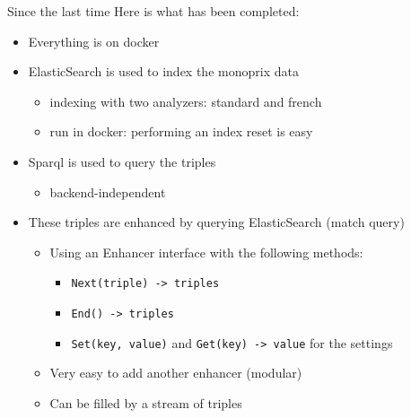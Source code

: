 \documentclass[10pt]{beamer}
\begin{document}
\begin{frame}{Since the last time}
    Here is what has been completed:
	\begin{itemize}
		\item Everything is on docker
	    \item ElasticSearch is used to index the monoprix data
	    \begin{itemize}
	        \item indexing with two analyzers: standard and french
	        \item run in docker: performing an index reset is easy
	    \end{itemize}
	    \item Sparql is used to query the triples
	    \begin{itemize}
	        \item backend-independent
	    \end{itemize}
	    \item These triples are enhanced by querying ElasticSearch (match query)
	    \begin{itemize}
	        \item Using an Enhancer interface with the following methods:
	        \begin{itemize}
	            \item \texttt{Next(triple) -> triples}
	            \item \texttt{End() -> triples}
	            \item \texttt{Set(key, value)} and \texttt{Get(key) -> value} for the settings
	        \end{itemize}
	        \item Very easy to add another enhancer (modular)
	        \item Can be filled by a stream of triples
	    \end{itemize}
	\end{itemize}
\end{frame}
\end{document}
